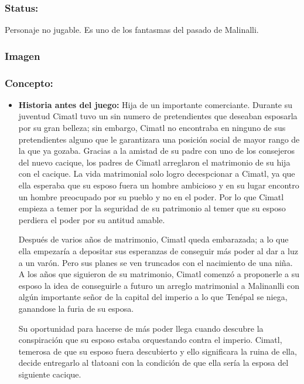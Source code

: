 \documentclass[11pt,letterpaper]{article}
\begin{document}
\subsubsection{Status:}
Personaje no jugable.
Es uno de los fantasmas del pasado de Malinalli.
\subsubsection{Imagen}
\subsubsection{Concepto:}
\begin{itemize}
	\item \textbf{Historia antes del juego:}
	Hija de un importante comerciante. Durante su juventud Cimatl tuvo un sin numero de pretendientes que deseaban esposarla por su gran belleza; sin embargo, Cimatl no encontraba en ninguno de sus pretendientes alguno que le garantizara una posición social de mayor rango de la que ya gozaba. Gracias a la amistad de su padre con uno de los consejeros del nuevo cacique, los padres de Cimatl arreglaron el matrimonio de su hija con el cacique. La vida matrimonial solo logro decespcionar a Cimatl, ya que ella esperaba que su esposo fuera un hombre ambicioso y en su lugar encontro un hombre preocupado por su pueblo y no en el poder. Por lo que Cimatl empieza a temer por la seguridad de su patrimonio al temer que su esposo perdiera el poder por su antitud amable.
	\\
	\par
	Después de varios años de matrimonio, Cimatl queda embarazada; a lo que ella empezaría a depositar sus esperanzas de conseguir más poder al dar a luz a un varón. Pero sus planes se ven truncados con el nacimiento de una niña. A los años que siguieron de su matrimonio, Cimatl comenzó a proponerle a su esposo la idea de conseguirle a futuro un arreglo matrimonial a Malinanlli con algún importante señor de la capital del imperio a lo que Tenépal se niega, ganandose la furia de su esposa.
	\\
	\par
	Su oportunidad para hacerse de más poder llega cuando descubre la conspiración que su esposo estaba orquestando contra el imperio. Cimatl, temerosa de que su esposo fuera descubierto y ello significara la ruina de ella, decide entregarlo al tlatoani con la condición de que ella sería la esposa del siguiente cacique.
	\\
	\par

\end{itemize}
\end{document}

